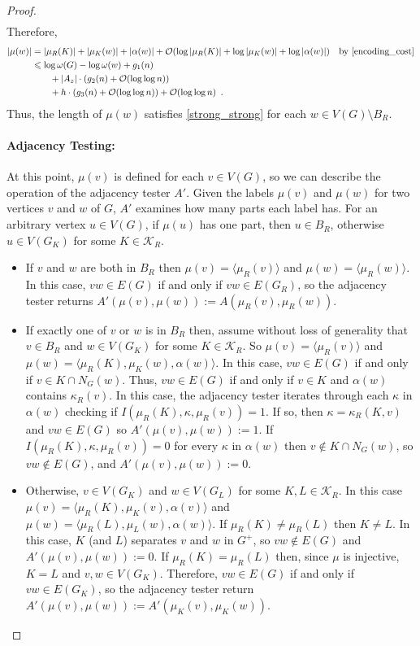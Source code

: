 \documentclass{patmorin}
\let\eqref\cref
\renewcommand{\le}{\leqslant}
\newcommand{\Oh}{\calO}
\newcommand{\calK}{\mathcal{K}}
\newcommand{\calO}{\mathcal{O}}
\begin{document}
\begin{proof}
\begin{align*}
    \end{align*}
    Therefore,
    \begin{align*}
      |\mu(w)|
        & =|\mu_R(K)|+|\mu_K(w)|+|\alpha(w)|+ \Oh(\log|\mu_R(K)|+\log|\mu_K(w)|+\log|\alpha(w)|)
        & \text{by \eqref{encoding_cost}} \\
        & \le \log \omega(G) - \log\omega(w) + g_1(n)\\
        & \qquad {} + |A_z|\cdot (g_2(n)+\Oh(\log\log n))\\
        & \qquad {} + h\cdot (g_3(n) + \Oh(\log\log n)) + \Oh(\log\log n)\enspace.
    \end{align*}
    Thus, the length of $\mu(w)$ satisfies \eqref{strong_strong} for each $w\in V(G)\setminus B_R$.

    \paragraph{Adjacency Testing:}  At this point, $\mu(v)$ is defined for each $v\in V(G)$, so we can describe the operation of the adjacency tester $A'$.
    Given the labels $\mu(v)$ and $\mu(w)$ for two vertices $v$ and $w$ of $G$, $A'$ examines how many parts each label has.
    For an arbitrary vertex $u\in V(G)$, if $\mu(u)$ has one part, then $u\in B_R$,
    otherwise $u\in V(G_K)$ for some $K\in\calK_R$.
    \begin{itemize}
      \item If $v$ and $w$ are both in $B_R$ then $\mu(v)=\langle\mu_R(v)\rangle$ and $\mu(w)=\langle\mu_R(w)\rangle$.  In this case, $vw\in E(G)$ if and only if $vw\in E(G_R)$, so the adjacency tester returns $A'(\mu(v),\mu(w)):=A(\mu_R(v),\mu_R(w))$.
      \item If exactly one of $v$ or $w$ is in $B_R$ then, assume without loss of generality that $v\in B_R$ and $w\in V(G_K)$ for some $K\in\calK_R$.
      So $\mu(v)=\langle\mu_R(v)\rangle$ and $\mu(w)=\langle\mu_R(K),\mu_K(w),\alpha(w)\rangle$.
      In this case, $vw\in E(G)$ if and only if $v\in K\cap N_G(w)$.  Thus, $vw\in E(G)$ if and only if $v\in K$ and $\alpha(w)$ contains $\kappa_R(v)$.  In this case, the adjacency tester iterates through each $\kappa$ in $\alpha(w)$ checking if $I(\mu_R(K),\kappa,\mu_R(v))=1$.  If so, then $\kappa=\kappa_R(K,v)$ and $vw\in E(G)$ so $A'(\mu(v),\mu(w)):=1$. If $I(\mu_R(K),\kappa,\mu_R(v))=0$ for every $\kappa$ in $\alpha(w)$ then $v\not\in K\cap N_G(w)$, so  $vw\not\in E(G)$, and $A'(\mu(v),\mu(w)):=0$.
      \item Otherwise, $v\in V(G_K)$ and $w\in V(G_{L})$ for some $K,L\in\calK_R$.
      In this case $\mu(v)=\langle\mu_R(K),\mu_K(v),\alpha(v)\rangle$ and $\mu(w)=\langle\mu_R(L),\mu_{L}(w),\alpha(w)\rangle$.
      If $\mu_R(K)\neq\mu_R(L)$ then $K\neq L$. In this case, $K$ (and $L$) separates $v$ and $w$ in $G^+$, so $vw\not\in E(G)$ and $A'(\mu(v),\mu(w)):=0$.
      If $\mu_R(K)=\mu_R(L)$ then, since $\mu$ is injective, $K=L$ and $v,w\in V(G_K)$.  Therefore, $vw\in E(G)$ if and only if $vw\in E(G_K)$, so the adjacency tester return $A'(\mu(v),\mu(w)):=A'(\mu_{K}(v),\mu_K(w))$.
    \end{itemize}


\end{proof}
\end{document}
